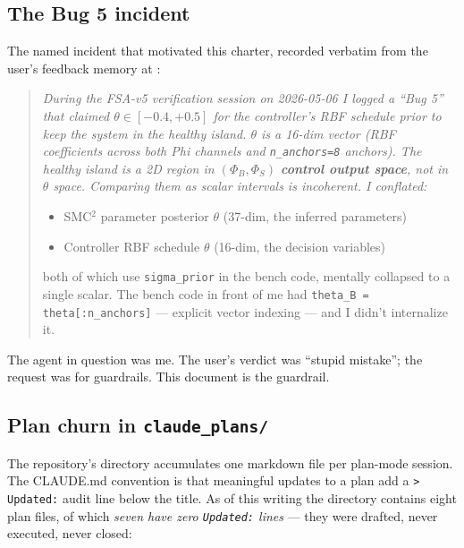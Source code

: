 \documentclass[11pt,a4paper]{article}
\begin{document}
\subsection{The Bug 5 incident}
\label{sec:bug5}

The named incident that motivated this charter, recorded verbatim
from the user's feedback memory at
:

\begin{quote}\itshape
During the FSA-v5 verification session on 2026-05-06 I logged a
``Bug 5'' that claimed $\theta \in [-0.4, +0.5]$ for the controller's
RBF schedule prior to keep the system in the healthy island.
$\theta$ is a 16-dim vector (RBF coefficients across both Phi
channels and \texttt{n\_anchors=8} anchors). The healthy island is a
2D region in $(\Phi_B, \Phi_S)$ \textbf{control output space}, not in
$\theta$ space. Comparing them as scalar intervals is incoherent. I
conflated:
\begin{itemize}
\item SMC$^2$ parameter posterior $\theta$ (37-dim, the inferred
  parameters)
\item Controller RBF schedule $\theta$ (16-dim, the decision
  variables)
\end{itemize}
both of which use \texttt{sigma\_prior} in the bench code, mentally
collapsed to a single scalar. The bench code in front of me had
\texttt{theta\_B = theta[:n\_anchors]} --- explicit vector indexing
--- and I didn't internalize it.
\end{quote}

The agent in question was me. The user's verdict was ``stupid
mistake''; the request was for guardrails. This document is the
guardrail.

\subsection{Plan churn in \texttt{claude\_plans/}}
\label{sec:plan-churn}

The repository's  directory accumulates one
markdown file per plan-mode session. The CLAUDE.md convention is
that meaningful updates to a plan add a \verb|> Updated:| audit
line below the title. As of this writing the directory contains
eight plan files, of which \emph{seven have zero \texttt{Updated:}
lines} --- they were drafted, never executed, never closed:
\end{document}
